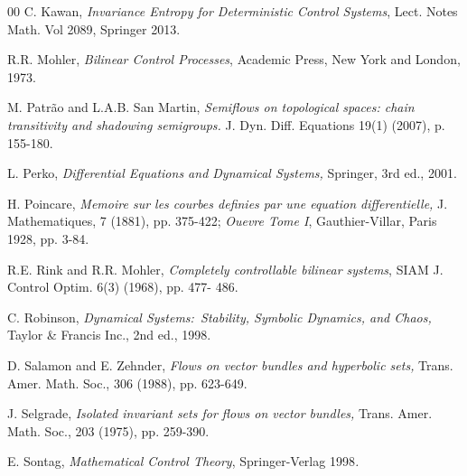 \documentclass[preprint,12pt]{elsarticle}
\begin{document}
\begin{thebibliography}{00}
 C. Kawan, \textit{ Invariance Entropy for Deterministic
Control Systems}, Lect. Notes Math. Vol 2089, Springer 2013.

 R.R. Mohler,  \textit{Bilinear Control Processes},
Academic Press, New York and London, 1973.

 M. Patr\~{a}o and L.A.B. San Martin,
 \textit{Semiflows on topological spaces: chain transitivity and shadowing
semigroups. }J. Dyn. Diff. Equations 19(1) (2007), p. 155-180.

 L. Perko,  \textit{Differential Equations and Dynamical
Systems,} Springer, 3rd ed., 2001.

 H. Poincare,   \textit{Memoire sur les courbes definies
par une equation differentielle, }J. Mathematiques, 7 (1881), pp. 375-422;
 \textit{Ouevre Tome I}, Gauthier-Villar, Paris 1928, pp. 3-84.

 R.E. Rink and R.R. Mohler,    \textit{Completely
controllable bilinear systems}, SIAM J. Control Optim. 6(3) (1968), pp. 477-
486\textsc{.}

 C. Robinson,  \textit{Dynamical Systems:\ Stability,
Symbolic Dynamics, and Chaos,} Taylor \& Francis Inc., 2nd ed., 1998.

 D. Salamon and E. Zehnder,  \textit{Flows on vector
bundles and hyperbolic sets, }Trans. Amer. Math. Soc., 306 (1988), pp. 623-649.

 J. Selgrade, \textit{Isolated invariant sets for flows
on vector bundles, }Trans. Amer. Math. Soc., 203 (1975), pp. 259-390.

 E. Sontag,  \textit{Mathematical Control Theory},
Springer-Verlag 1998\emph{.}
\end{thebibliography}
\end{document}
